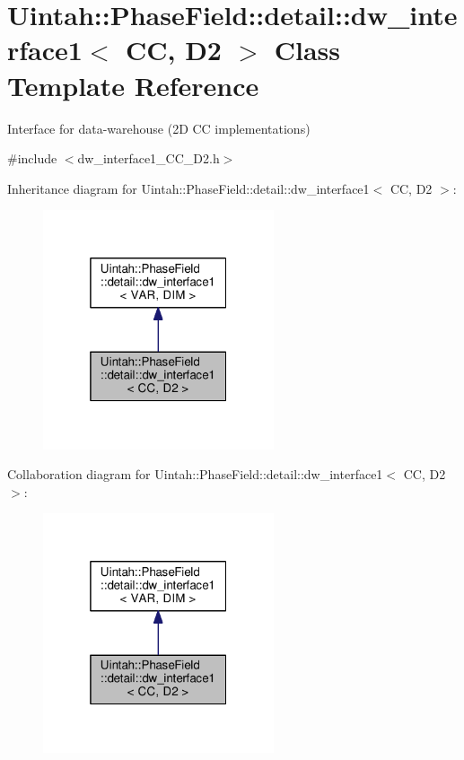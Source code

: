 \hypertarget{classUintah_1_1PhaseField_1_1detail_1_1dw__interface1_3_01CC_00_01D2_01_4}{}\section{Uintah\+:\+:Phase\+Field\+:\+:detail\+:\+:dw\+\_\+interface1$<$ CC, D2 $>$ Class Template Reference}
\label{classUintah_1_1PhaseField_1_1detail_1_1dw__interface1_3_01CC_00_01D2_01_4}


Interface for data-\/warehouse (2D CC implementations)  




{\ttfamily \#include $<$dw\+\_\+interface1\+\_\+\+C\+C\+\_\+\+D2.\+h$>$}



Inheritance diagram for Uintah\+:\+:Phase\+Field\+:\+:detail\+:\+:dw\+\_\+interface1$<$ CC, D2 $>$\+:\nopagebreak
\begin{figure}[H]
\begin{center}
\leavevmode
\includegraphics[width=193pt]{classUintah_1_1PhaseField_1_1detail_1_1dw__interface1_3_01CC_00_01D2_01_4__inherit__graph}
\end{center}
\end{figure}


Collaboration diagram for Uintah\+:\+:Phase\+Field\+:\+:detail\+:\+:dw\+\_\+interface1$<$ CC, D2 $>$\+:\nopagebreak
\begin{figure}[H]
\begin{center}
\leavevmode
\includegraphics[width=193pt]{classUintah_1_1PhaseField_1_1detail_1_1dw__interface1_3_01CC_00_01D2_01_4__coll__graph}
\end{center}
\end{figure}
